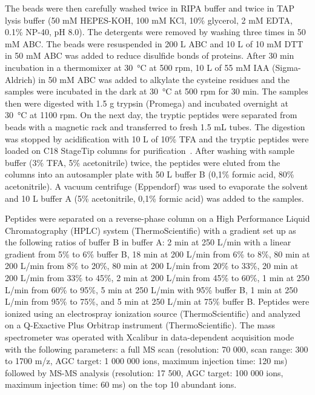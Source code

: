 The beads were then carefully washed twice in RIPA buffer and twice in TAP lysis buffer (50 mM HEPES-KOH, 100 mM KCl, 10\% glycerol, 2 mM EDTA, 0.1\% NP-40, pH 8.0). The detergents were removed by washing three times in 50 mM ABC. The beads were resuspended in 200 {}\textmu L ABC and 10 {}\textmu L of 10 mM DTT in 50 mM ABC was added to reduce disulfide bonds of proteins. After 30 min incubation in a thermomixer at \SI{30}{\celsius} at 500 rpm, 10 {}\textmu L of 55 mM IAA (Sigma-Aldrich) in 50 mM ABC was added to alkylate the cysteine residues and the samples were incubated in the dark at \SI{30}{\celsius} at 500 rpm for 30 min. The samples then were digested with 1.5 {}\textmu g trypsin (Promega) and incubated overnight at \SI{30}{\celsius} at 1100 rpm. On the next day, the tryptic peptides were separated from beads with a magnetic rack and transferred to fresh 1.5 mL tubes. The digestion was stopped by acidification with 10 \textmu L of 10\% TFA and the tryptic peptides were loaded on C18 StageTip columns for purification~\cite{Rappsilber}. After washing with sample buffer (3\% TFA, 5\% acetonitrile) twice, the peptides were eluted from the columns into an autosampler plate with 50 {}\textmu L buffer B (0,1\% formic acid, 80\% acetonitrile). A vacuum centrifuge (Eppendorf) was used to evaporate the solvent and 10 {}\textmu L buffer A (5\% acetonitrile, 0,1\% formic acid) was added to the samples.

Peptides were separated on a reverse-phase column on a High Performance Liquid Chromatography (HPLC) system (ThermoScientific) with a gradient set up as the following ratios of buffer B in buffer A: 2 min at 250 {}\textmu L/min with a linear gradient from 5\% to 6\% buffer B, 18 min at 200 {}\textmu L/min from 6\% to 8\%, 80 min at 200 {}\textmu L/min from 8\% to 20\%, 80 min at 200 {}\textmu L/min from 20\% to 33\%, 20 min at 200 {}\textmu L/min from 33\% to 45\%, 2 min at 200 {}\textmu L/min from 45\% to 60\%, 1 min at 250 {}\textmu L/min from 60\% to 95\%, 5 min at 250 {}\textmu L/min with 95\% buffer B, 1 min at 250 {}\textmu L/min from 95\% to 75\%, and 5 min at 250 {}\textmu L/min at 75\% buffer B. Peptides were ionized using an electrospray ionization source (ThermoScientific) and analyzed on a Q-Exactive Plus Orbitrap instrument (ThermoScientific). The mass spectrometer was operated with Xcalibur in data-dependent acquisition mode with the following parameters: a full MS scan (resolution: 70 000, scan range: 300 to 1700 m/z, AGC target: 1 000 000 ions, maximum injection time: 120 ms) followed by MS-MS analysis (resolution: 17 500, AGC target: 100 000 ions, maximum injection time: 60 ms) on the top 10 abundant ions.

